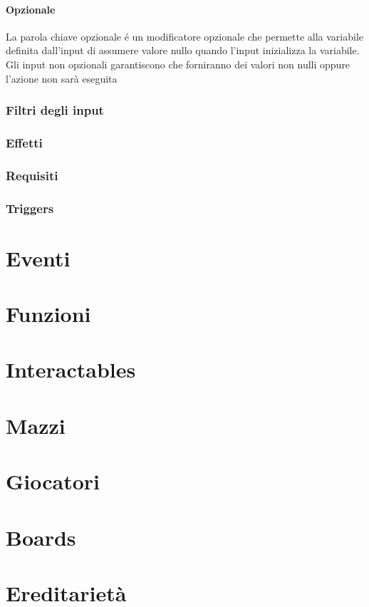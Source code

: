 \paragraph{Opzionale}
La parola chiave opzionale é un modificatore opzionale che permette alla variabile definita dall'input
di assumere valore nullo quando l'input inizializza la variabile. \\ 
Gli input non opzionali garantiscono che forniranno dei valori non nulli oppure l'azione non sarà eseguita

\subsubsection{Filtri degli input}

\subsubsection{Effetti}
\subsubsection{Requisiti}
\subsubsection{Triggers}

\section{Eventi}

\section{Funzioni}

\section{Interactables}

\section{Mazzi}

\section{Giocatori}

\section{Boards}

\section{Ereditarietà}





